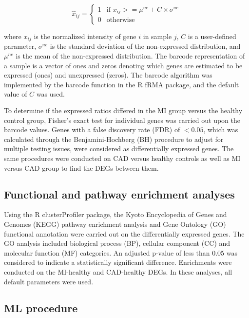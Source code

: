 \documentclass[smallextended]{svjour3}       %
\begin{document}
\[
\hat{x}_{ij} = \left\{
  \begin{array}{ll}
    1 & \mbox{if } x_{ij} >= \mu^{ne} + C \times \sigma^{ne} \\
    0 & \mbox{otherwise}
  \end{array}
\right.
\]

where \(x_{ij}\) is the normalized intensity of gene \(i\) in sample
\(j\), \(C\) is a user-defined parameter, \(\sigma^{ne}\) is the
standard deviation of the non-expressed distribution, and \(\mu^{ne}\)
is the mean of the non-expressed distribution. The barcode
representation of a sample is a vector of ones and zeros denoting which
genes are estimated to be expressed (ones) and unexpressed (zeros). The
barcode algorithm was implemented by the barcode function in the R fRMA
package, and the default value of \(C\) was used.

To determine if the expressed ratios differed in the MI group versus the
healthy control group, Fisher's exact test for individual genes was
carried out upon the barcode values. Genes with a false discovery rate
(FDR) of \(< 0.05\), which was calculated through the Benjamini-Hochberg
(BH) procedure to adjust for multiple testing issues, were considered as
differentially expressed genes. The same procedures were conducted on
CAD versus healthy controls as well as MI versus CAD group to find the
DEGs between them.

\hypertarget{functional-and-pathway-enrichment-analyses}{%
\subsection{Functional and pathway enrichment
analyses}\label{functional-and-pathway-enrichment-analyses}}

Using the R clusterProfiler package, the Kyoto Encyclopedia of Genes and
Genomes (KEGG) pathway enrichment analysis and Gene Ontology (GO)
functional annotation were carried out on the differentially expressed
genes. The GO analysis included biological process (BP), cellular
component (CC) and molecular function (MF) categories. An adjusted
p-value of less than 0.05 was considered to indicate a statistically
significant difference. Enrichments were conducted on the MI-healthy and
CAD-healthy DEGs. In these analyses, all default parameters were used.

\hypertarget{ml-procedure}{%
\subsection{ML procedure}\label{ml-procedure}}
\end{document}
